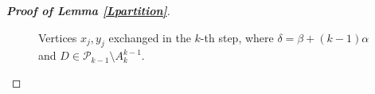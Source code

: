 \documentclass[11pt, a4paper]{article}
\theoremstyle{definition}
\newcommand{\<}{\subseteq}
\begin{document}
\begin{proof}[\bf Proof of Lemma \ref{Lpartition}]
\begin{figure}[ht!]
    \caption{Vertices $x_j,y_j$ exchanged in the $k$-th step, where 
$\delta=\beta+(k-1)\alpha$ and $D \in \mathcal{P}_{k-1}\setminus{A_k^{k-1}}$.}
    \label{fig:exchang}
\end{figure}





\end{proof}
\end{document}
